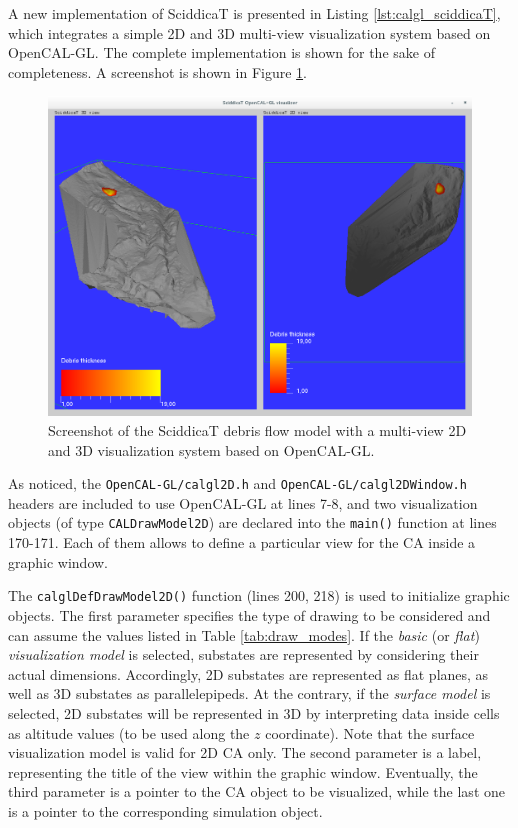A new implementation of SciddicaT is presented in Listing
\ref{lst:calgl_sciddicaT}, which integrates a simple 2D and 3D
multi-view visualization system based on OpenCAL-GL. The complete
implementation is shown for the sake of completeness. A screenshot is
shown in Figure \ref{fig:calgl_sciddicaT1}.

\begin{figure}
  \begin{center}
    \includegraphics[width=12cm]{./images/OpenCAL/calgl_sciddicaT1}
    \caption{Screenshot of the SciddicaT debris flow model with a
      multi-view 2D and 3D visualization system based on OpenCAL-GL.}
    \label{fig:calgl_sciddicaT1}
  \end{center}
\end{figure}



As noticed, the \verb'OpenCAL-GL/calgl2D.h' and
\verb'OpenCAL-GL/calgl2DWindow.h' headers are included to use
OpenCAL-GL at lines 7-8, and two visualization objects (of type
\verb'CALDrawModel2D') are declared into the \verb'main()' function
at lines 170-171. Each of them allows to define a particular view for
the CA inside a graphic window.

The \verb'calglDefDrawModel2D()' function (lines 200, 218) is used to
initialize graphic objects. The first parameter specifies the type of
drawing to be considered and can assume the values listed in Table
\ref{tab:draw_modes}. If the \emph{basic} (or \emph{flat})
\emph{visualization model} is selected, substates are represented by
considering their actual dimensions. Accordingly, 2D substates are
represented as flat planes, as well as 3D substates as
parallelepipeds. At the contrary, if the \emph{surface model} is
selected, 2D substates will be represented in 3D by interpreting data
inside cells as altitude values (to be used along the $z$
coordinate). Note that the surface visualization model is valid for 2D
CA only. The second parameter is a label, representing the title of the
view within the graphic window. Eventually, the third parameter is a
pointer to the CA object to be visualized, while the last one is a
pointer to the corresponding simulation object.

